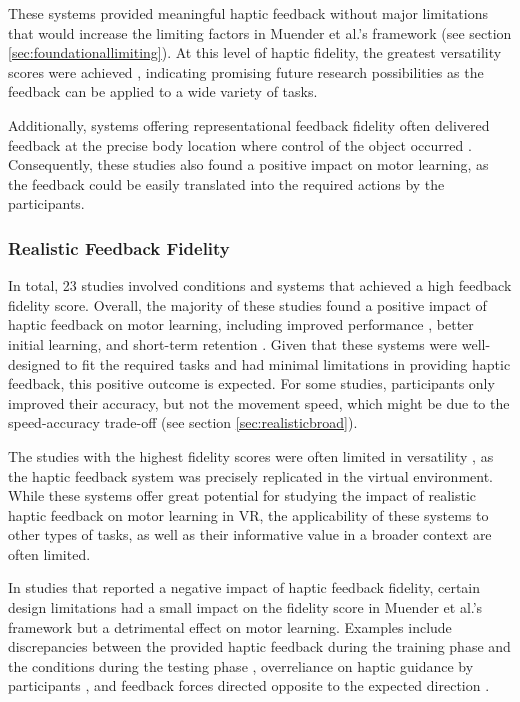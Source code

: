 These systems provided meaningful haptic feedback without major limitations that would increase the limiting factors in Muender et al.'s framework (see section \ref{sec:foundationallimiting}). At this level of haptic fidelity, the greatest versatility scores were achieved \cite{Yang2023, McAnally2023}, indicating promising future research possibilities as the feedback can be applied to a wide variety of tasks.

Additionally, systems offering representational feedback fidelity often delivered feedback at the precise body location where control of the object occurred \cite{Najdovski2020, Manivannan2008}. Consequently, these studies also found a positive impact on motor learning, as the feedback could be easily translated into the required actions by the participants.


\subsubsection{Realistic Feedback Fidelity}
In total, 23 studies involved conditions and systems that achieved a high feedback fidelity score. Overall, the majority of these studies found a positive impact of haptic feedback on motor learning, including improved performance \cite{Fehlberg2012, LiuG2014, Mohanty2023}, better initial learning, and short-term retention \cite{LeeH2014}. Given that these systems were well-designed to fit the required tasks and had minimal limitations in providing haptic feedback, this positive outcome is expected.
For some studies, participants only improved their accuracy, but not the movement speed, which might be due to the speed-accuracy trade-off \cite{LiuG2014, Caccianiga2021} (see section \ref{sec:realisticbroad}).

The studies with the highest fidelity scores were often limited in versatility \cite{Huang2007, LeeH2014, Vaghela2021}, as the haptic feedback system was precisely replicated in the virtual environment. While these systems offer great potential for studying the impact of realistic haptic feedback on motor learning in VR, the applicability of these systems to other types of tasks, as well as their informative value in a broader context are often limited.

In studies that reported a negative impact of haptic feedback fidelity, certain design limitations had a small impact on the fidelity score in Muender et al.'s framework \cite{Muender2022HapticReality} but a detrimental effect on motor learning. Examples include discrepancies between the provided haptic feedback during the training phase and the conditions during the testing phase \cite{Morris2007}, overreliance on haptic guidance by participants \cite{Oezen2022}, and feedback forces directed opposite to the expected direction \cite{Macuga2019}.


